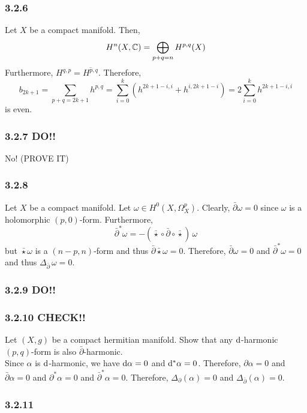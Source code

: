 \documentclass[12pt]{article}
\begin{document}
\subsubsection{3.2.6}

Let $X$ be a compact \kahler manifold. Then,
\[ H^{n}(X, \mathbb{C}) = \bigoplus_{p + q = n} H^{p,q}(X) \]
Furthermore, $H^{q,p} = \overline{H^{p,q}}$. Therefore,
\[ b_{2k + 1} = \sum_{p + q = 2k + 1} h^{p, q} = \sum_{i = 0}^k (h^{2 k + 1 - i, i} + h^{i, 2k + 1 - i}) = 2 \sum_{i = 0}^k h^{2k + 1 - i, i} \]
is even.

\subsubsection{3.2.7 DO!!}

No! (PROVE IT)

\subsubsection{3.2.8}

Let $X$ be a compact \kahler manifold. Let $\omega \in H^0(X, \Omega^p_X)$. Clearly, $\bar{\partial} \omega = 0$ since $\omega$ is a holomorphic $(p, 0)$-form. Furthermore, 
\[ \bar{\partial}^* \omega = - (\bar{\star} \circ \bar{\partial} \circ \bar{\star}) \, \omega \]
but $\bar{\star} \omega$ is a $(n - p, n)$-form and thus $\bar{\partial} \bar{\star} \omega = 0$. Therefore, $\bar{\partial} \omega = 0$ and $\bar{\partial}^* \omega = 0$ and thus $\Delta_{\bar{\partial}} \, \omega = 0$.


\subsubsection{3.2.9 DO!!}

\subsubsection{3.2.10 CHECK!!}

Let $(X, g)$ be a compact hermitian manifold. Show that any $\mathrm{d}$-harmonic $(p,q)$-form is also $\bar{\partial}$-harmonic.
\bigskip\\
Since $\alpha$ is $\mathrm{d}$-harmonic, we have $\mathrm{d}{\alpha} = 0$ and $\mathrm{d}^*{\alpha} = 0$. Therefore, $\partial \alpha = 0$ and $\bar{\partial} \alpha = 0$ and $\partial^* \alpha = 0$ and $\bar{\partial}^* \alpha = 0$. Therefore, $\Delta_{\partial} (\alpha) = 0$ and $\Delta_{\bar{\partial}} (\alpha) = 0$.

\subsubsection{3.2.11}
\end{document}
